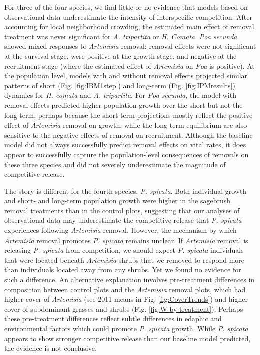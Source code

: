 \documentclass[11pt]{article}
\begin{document}
\begin{doublespacing}
For three of the four species, we find little or no evidence that models based on observational data underestimate the intensity of interspecific competition. After accounting for local neighborhood crowding, the estimated main effect of removal treatment was never significant for \textit{A. tripartita} or \textit{H. Comata}. \textit{Poa secunda} showed mixed responses to \textit{Artemisia} removal: removal effects were not significant at the survival stage, were positive at the growth stage, and negative at the recruitment stage (where the estimated effect of \textit{Artemisia} on \textit{Poa} is positive). At the population level, models with and without removal effects projected similar patterns of short (Fig. \ref{fig:IBM1step}) and long-term (Fig. \ref{fig:IPMresults}) dynamics for \textit{H. comata} and \textit{A. tripartita}. For \textit{Poa secunda}, the model with removal effects predicted higher population growth over the short but not the long-term, perhaps because the short-term projections mostly reflect the positive effect of \textit{Artemisia} removal on growth, while the long-term equilibrium are also sensitive to the negative effects of removal on recruitment. Although the baseline model did not always successfully predict removal effects on vital rates, it does appear to successfully capture the population-level consequences of removals on these three species and did not severely underestimate the magnitude of competitive release.

The story is different for the fourth species, \textit{P. spicata}. Both individual growth and short- and long-term population growth were higher in the sagebrush removal treatments than in the control plots, suggesting that our analyses of observational data may underestimate the competitive release that \textit{P. spicata} experiences following \textit{Artemisia} removal. However, the mechanism by which \textit{Artemisia} removal promotes \textit{P. spicata} remains unclear. If  \textit{Artemisia} removal is releasing \textit{P. spicata} from competition, we should expect \textit{P. spicata} individuals that were located beneath \textit{Artemisia} shrubs that we removed to respond more than individuals located away from any shrubs. Yet we found no evidence for such a difference. An alternative explanation involves pre-treatment differences in composition between control plots and  the \textit{Artemisia} removal  plots, which had higher cover of \textit{Artemisia} (see 2011 means in Fig. \ref{fig:CoverTrends}) and higher cover of subdominant grasses and shrubs (Fig. \ref{fig:W-by-treatment}). Perhaps these pre-treatment differences reflect subtle differences in edaphic and environmental factors which could promote \textit{P. spicata} growth. While \textit{P. spicata} appears to show stronger competitive release than our baseline model predicted, the evidence is not conclusive. 


\end{doublespacing}
\end{document}
